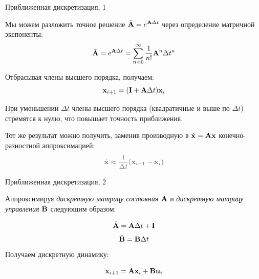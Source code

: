 \documentclass{beamer}
\begin{document}
\begin{frame}{Приближенная дискретизация, 1}
	\begin{flushleft}
		
		Мы можем разложить точное решение $\bar{\mathbf{A}} = e^{\mathbf{A}\Delta t}$ через определение матричной экспоненты:
		\begin{equation}
			\bar{\mathbf{A}} = e^{\mathbf{A}\Delta t} =  \sum_{n=0}^{\infty} \frac{1}{n!} \mathbf{A}^n \Delta t^n
		\end{equation}
		
		Отбрасывая члены высшего порядка, получаем:
		\begin{equation}
			\mathbf{x}_{i + 1} = ( \mathbf{I} + \mathbf{A} \Delta t) \mathbf{x}_i
		\end{equation}
		
		При уменьшении $\Delta t$ члены высшего порядка (квадратичные и выше по $\Delta t$) стремятся к нулю, что повышает точность приближения.
		
		\bigskip
		
		\textcolor{mynormalgray}
		{
			Тот же результат можно получить, заменив производную в $\dot{\mathbf{x}} = \mathbf{A}  \mathbf{x}$ конечно-разностной аппроксимацией:}
		\begin{equation*}
			\textcolor{mynormalgray}
			{\dot {\bo{x}} \approx \frac{1}{\Delta t}(\bo{x}_{i+1} - \bo{x}_i)}
		\end{equation*}
		
	\end{flushleft}
\end{frame}

\begin{frame}{Приближенная дискретизация, 2}
	\begin{flushleft}
		
		Аппроксимируя \emph{дискретную матрицу состояния} $\bar{\mathbf{A}}$ и \emph{дискретную матрицу управления} $\bar{\mathbf{B}}$ следующим образом:
		
		\begin{equation}
			\bar{\mathbf{A}} = \mathbf{A} \Delta t + \mathbf{I}
		\end{equation}
		\begin{equation}
			\bar{\mathbf{B}} = \mathbf{B} \Delta t
		\end{equation}
		Получаем дискретную динамику:
		
		\begin{equation}
			\mathbf{x}_{i+1} = \bar{\mathbf{A}} \mathbf{x}_i + \bar{\mathbf{B}} \mathbf{u}_i
		\end{equation}
		
	\end{flushleft}
\end{frame}
\end{document}
